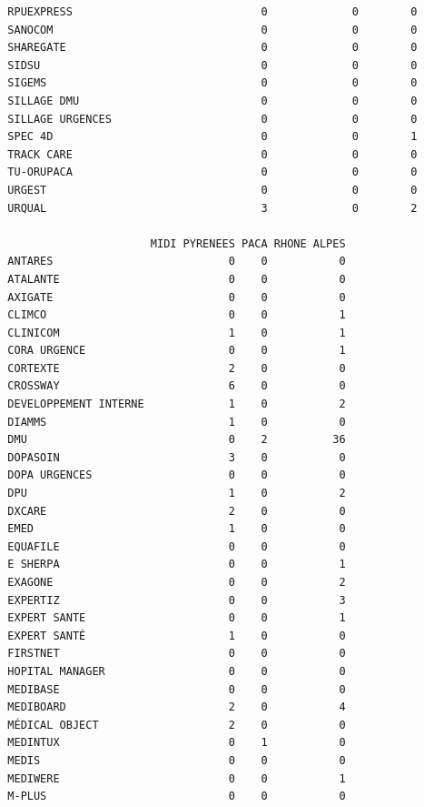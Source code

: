 \documentclass[]{article}
\begin{document}
\begin{verbatim}
  RPUEXPRESS                             0             0        0
  SANOCOM                                0             0        0
  SHAREGATE                              0             0        0
  SIDSU                                  0             0        0
  SIGEMS                                 0             0        0
  SILLAGE DMU                            0             0        0
  SILLAGE URGENCES                       0             0        0
  SPEC 4D                                0             0        1
  TRACK CARE                             0             0        0
  TU-ORUPACA                             0             0        0
  URGEST                                 0             0        0
  URQUAL                                 3             0        2
                       
                        MIDI PYRENEES PACA RHONE ALPES
  ANTARES                           0    0           0
  ATALANTE                          0    0           0
  AXIGATE                           0    0           0
  CLIMCO                            0    0           1
  CLINICOM                          1    0           1
  CORA URGENCE                      0    0           1
  CORTEXTE                          2    0           0
  CROSSWAY                          6    0           0
  DEVELOPPEMENT INTERNE             1    0           2
  DIAMMS                            1    0           0
  DMU                               0    2          36
  DOPASOIN                          3    0           0
  DOPA URGENCES                     0    0           0
  DPU                               1    0           2
  DXCARE                            2    0           0
  EMED                              1    0           0
  EQUAFILE                          0    0           0
  E SHERPA                          0    0           1
  EXAGONE                           0    0           2
  EXPERTIZ                          0    0           3
  EXPERT SANTE                      0    0           1
  EXPERT SANTÉ                      1    0           0
  FIRSTNET                          0    0           0
  HOPITAL MANAGER                   0    0           0
  MEDIBASE                          0    0           0
  MEDIBOARD                         2    0           4
  MÉDICAL OBJECT                    2    0           0
  MEDINTUX                          0    1           0
  MEDIS                             0    0           0
  MEDIWERE                          0    0           1
  M-PLUS                            0    0           0

\end{verbatim}
\end{document}
